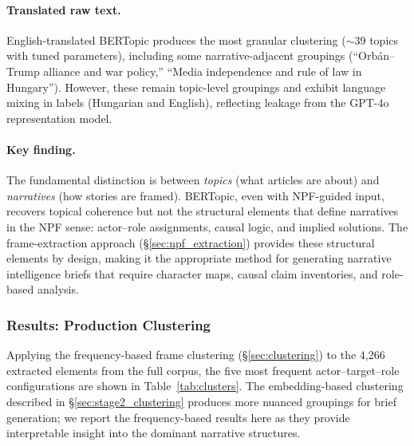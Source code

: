 \documentclass[10pt, a4paper]{article}
\begin{document}
\paragraph{Translated raw text.}
English-translated BERTopic produces the most granular clustering (${\sim}$39 topics with tuned parameters), including some narrative-adjacent groupings (``Orb\'an--Trump alliance and war policy,'' ``Media independence and rule of law in Hungary''). However, these remain topic-level groupings and exhibit language mixing in labels (Hungarian and English), reflecting leakage from the GPT-4o representation model.

\paragraph{Key finding.}
The fundamental distinction is between \emph{topics} (what articles are about) and \emph{narratives} (how stories are framed). BERTopic, even with NPF-guided input, recovers topical coherence but not the structural elements that define narratives in the NPF sense: actor--role assignments, causal logic, and implied solutions. The frame-extraction approach (\S\ref{sec:npf_extraction}) provides these structural elements by design, making it the appropriate method for generating narrative intelligence briefs that require character maps, causal claim inventories, and role-based analysis.


\subsubsection{Results: Production Clustering}
\label{sec:results_clustering}

Applying the frequency-based frame clustering (\S\ref{sec:clustering}) to the 4{,}266 extracted elements from the full corpus, the five most frequent actor--target--role configurations are shown in Table~\ref{tab:clusters}. The embedding-based clustering described in \S\ref{sec:stage2_clustering} produces more nuanced groupings for brief generation; we report the frequency-based results here as they provide interpretable insight into the dominant narrative structures.
\end{document}
